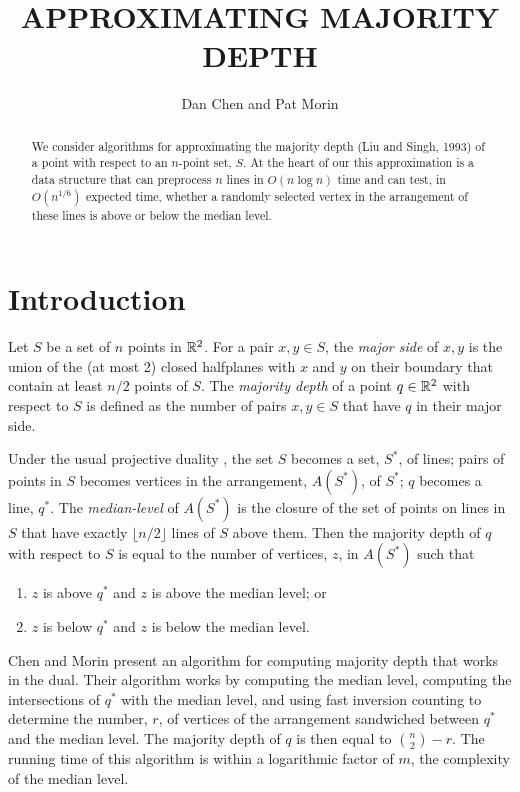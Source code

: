 \documentclass{patmorin}
\title{\MakeUppercase{Approximating Majority Depth}}
\author{Dan Chen and Pat Morin}
\begin{document}
\maketitle

\begin{abstract}
We consider algorithms for approximating the majority depth (Liu and
Singh, 1993) of a point with respect to an $n$-point set, $S$.  At the
heart of our this approximation is a data structure that can preprocess
$n$ lines in $O(n\log n)$ time and can test, in $O(n^{1/6})$ expected
time, whether a randomly selected vertex in the arrangement of these
lines is above or below the median level.
\end{abstract}

\section{Introduction}

Let $S$ be a set of $n$ points in $\mathbb{R}^2$.  For a pair $x,y\in S$,
the \emph{major side} of $x,y$ is the union of the (at most 2) closed
halfplanes with $x$ and $y$ on their boundary that contain at least
$n/2$ points of $S$.  The \emph{majority depth} \cite{ls93,s91} of a
point $q\in\mathbb{R}^2$ with respect to $S$ is defined as the number of pairs
$x,y\in S$ that have $q$ in their major side.

Under the usual projective duality \cite{e97}, the set $S$ becomes
a set, $S^*$, of lines; pairs of points in $S$ becomes vertices
in the arrangement, $A(S^*)$, of $S^*$; $q$ becomes a line, $q^*$.
The \emph{median-level} of $A(S^*)$ is the closure of the set of points
on lines in $S$ that have exactly $\lfloor n/2\rfloor$ lines of $S$
above them.  Then the majority depth of $q$ with respect to $S$ is equal
to the number of vertices, $z$, in $A(S^*)$ such that
\begin{enumerate}
\item $z$ is above $q^*$ and $z$ is above the median level; or
\item $z$ is below $q^*$ and $z$ is below the median level.
\end{enumerate}

Chen and Morin \cite{cm11} present an algorithm for computing majority
depth that works in the dual.  Their algorithm works by computing the
median level, computing the intersections of $q^*$ with the median
level, and using fast inversion counting to determine the number, $r$,
of vertices of the arrangement sandwiched between $q^*$ and the median
level.  The majority depth of $q$ is then equal to $\binom{n}{2}-r$.
The running time of this algorithm is within a logarithmic factor of $m$,
the complexity of the median level.
\end{document}
